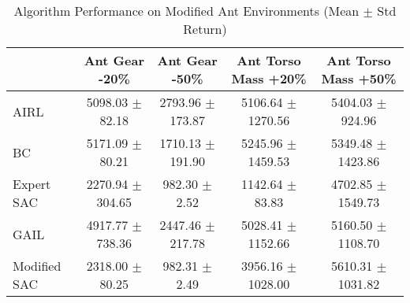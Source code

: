\begin{table}
\caption{Algorithm Performance on Modified Ant Environments (Mean $\pm$ Std Return)}
\label{tab:perf_mod_ant}
\begin{tabular}{lcccc}
\toprule
 & Ant Gear -20\% & Ant Gear -50\% & Ant Torso Mass +20\% & Ant Torso Mass +50\% \\
\midrule
AIRL & 5098.03 $\pm$ 82.18 & 2793.96 $\pm$ 173.87 & 5106.64 $\pm$ 1270.56 & 5404.03 $\pm$ 924.96 \\
BC & 5171.09 $\pm$ 80.21 & 1710.13 $\pm$ 191.90 & 5245.96 $\pm$ 1459.53 & 5349.48 $\pm$ 1423.86 \\
Expert SAC & 2270.94 $\pm$ 304.65 & 982.30 $\pm$ 2.52 & 1142.64 $\pm$ 83.83 & 4702.85 $\pm$ 1549.73 \\
GAIL & 4917.77 $\pm$ 738.36 & 2447.46 $\pm$ 217.78 & 5028.41 $\pm$ 1152.66 & 5160.50 $\pm$ 1108.70 \\
Modified SAC & 2318.00 $\pm$ 80.25 & 982.31 $\pm$ 2.49 & 3956.16 $\pm$ 1028.00 & 5610.31 $\pm$ 1031.82 \\
\bottomrule
\end{tabular}
\end{table}
